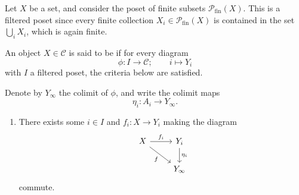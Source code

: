 \documentclass[main.tex]{subfiles}
\begin{document}
\begin{example}
  \label{eg:poset_of_finite_subsets}
  Let $X$ be a set, and consider the poset of finite subsets $\mathcal{P}_{\mathrm{fin}}(X)$. This is a filtered poset since every finite collection $X_{i} \in \mathcal{P}_{\mathrm{fin}}(X)$ is contained in the set $\bigcup_{i} X_{i}$, which is again finite.
\end{example}

\begin{definition}
  \label{def:compact_object}
  An object $X \in \mathcal{C}$ is said to be  if for every diagram
  \begin{equation*}
    \phi\colon I \to \mathcal{C};\qquad i \mapsto Y_{i}
  \end{equation*}
  with $I$ a filtered poset, the criteria below are satisfied.

  Denote by $Y_{\infty}$ the colimit of $\phi$, and write the colimit maps
  \begin{equation*}
    \eta_{i}\colon A_{i} \to Y_{\infty}.
  \end{equation*}

  \begin{enumerate}
    \item There exists some $i \in I$ and $f_{i}\colon X \to Y_{i}$ making the diagram
      \begin{equation*}
        \begin{tikzcd}
          X
          \arrow[r, "f_{i}"]
          \arrow[dr, swap, "f"]
          & Y_{i}
          \arrow[d, "\eta_{i}"]
          \\
          & Y_{\infty}
        \end{tikzcd}
      \end{equation*}
      commute.


\end{enumerate}
\end{definition}
\end{document}
